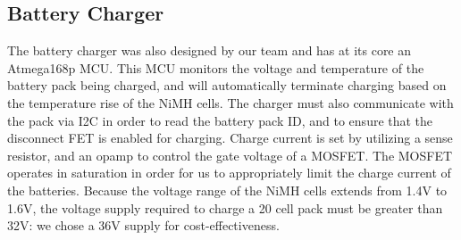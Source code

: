 \subsection{Battery Charger}
The battery charger was also designed by our team and has at its core
an Atmega168p MCU.  This MCU monitors the voltage and
temperature of the battery pack being charged, and will automatically
terminate charging based on the temperature rise of the NiMH cells.
The charger must also communicate with the pack via I2C in order to
read the battery pack ID, and to ensure that the disconnect FET is
enabled for charging.  Charge current is set by utilizing a sense
resistor, and an opamp to control the gate voltage of a MOSFET.  The
MOSFET operates in saturation in order for us to appropriately limit
the charge current of the batteries. Because the voltage range of the
NiMH cells extends from 1.4V to 1.6V, the voltage supply required to
charge a 20 cell pack must be greater than 32V: we chose a 36V supply for cost-effectiveness.
